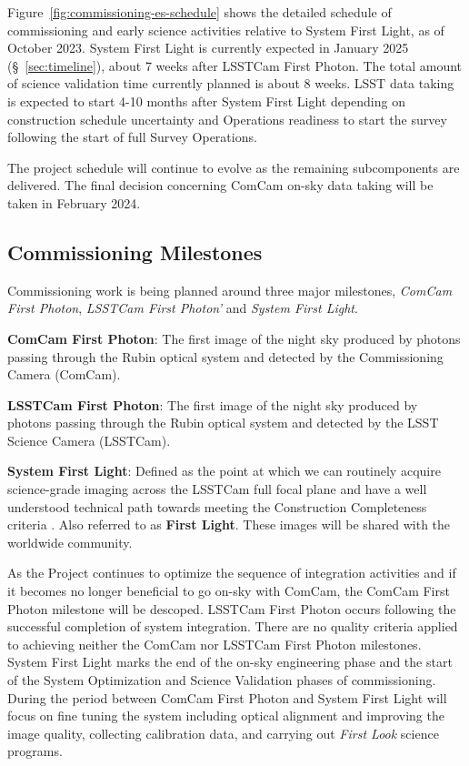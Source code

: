 Figure~\ref{fig:commissioning-es-schedule} shows the detailed schedule of commissioning and early science activities relative to System First Light, as of October 2023.
System First Light is currently expected in January 2025 (\S~\ref{sec:timeline}), about 7 weeks after LSSTCam First Photon.
The total amount of science validation time currently planned is about 8 weeks.  
LSST data taking is expected to start 4-10 months after System First Light depending on construction schedule uncertainty and Operations readiness to start the survey following the start of full Survey Operations.

The project schedule will continue to evolve as the remaining subcomponents are delivered. 
The final decision concerning ComCam on-sky data taking will be taken in February 2024.

\subsection{Commissioning Milestones}
\label{ssec:commissioning-milestones}

Commissioning work is being planned around three major milestones, \textit{ComCam First Photon}, \textit{LSSTCam First Photon'} and \textit{System First Light}. 

\textbf{ComCam First Photon}: The first image of the night sky produced by photons passing through the Rubin optical system and detected by the Commissioning Camera (ComCam).

\textbf {LSSTCam First Photon}: The first image of the night sky produced by photons passing through the Rubin optical system and detected by the LSST Science Camera (LSSTCam).

\textbf {System First Light}: Defined as the point at which we can routinely acquire science-grade imaging across the LSSTCam full focal plane and have a well understood technical path towards meeting the Construction Completeness criteria   .
Also referred to as \textbf{First Light}. 
These images will be shared with the worldwide community. 

As the Project continues to optimize the sequence of integration activities and if it becomes no longer beneficial to go on-sky with ComCam, the ComCam First Photon milestone will be descoped. 
LSSTCam First Photon occurs following the successful completion of system integration. 
There are no quality criteria applied to achieving  neither the ComCam nor LSSTCam First Photon milestones. 
System First Light  marks the end of the  on-sky engineering phase and the start of the System Optimization and Science Validation phases of commissioning.
During the period between ComCam First Photon and System First Light will focus on fine tuning the system including optical alignment and improving the image quality, collecting calibration data, and carrying out \textit{First Look} science programs. 


